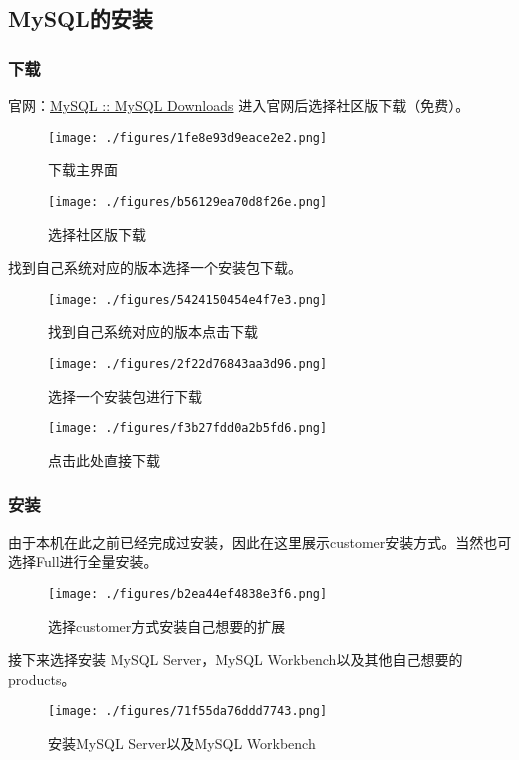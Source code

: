 \subsection{MySQL的安装}

\subsubsection{下载}
官网：\href{https://www.mysql.com/downloads/}{MySQL :: MySQL Downloads}
进入官网后选择社区版下载（免费）。
\begin{figure}[ht]
\centering
\texttt{[image: ./figures/1fe8e93d9eace2e2.png]}
\caption{下载主界面} \label{fig_MSQ001_3}
\end{figure}

\begin{figure}[ht]
\centering
\texttt{[image: ./figures/b56129ea70d8f26e.png]}
\caption{选择社区版下载} \label{fig_MSQ001_4}
\end{figure}
找到自己系统对应的版本选择一个安装包下载。
\begin{figure}[ht]
\centering
\texttt{[image: ./figures/5424150454e4f7e3.png]}
\caption{找到自己系统对应的版本点击下载} \label{fig_MSQ001_5}
\end{figure}

\begin{figure}[ht]
\centering
\texttt{[image: ./figures/2f22d76843aa3d96.png]}
\caption{选择一个安装包进行下载} \label{fig_MSQ001_6}
\end{figure}

\begin{figure}[ht]
\centering
\texttt{[image: ./figures/f3b27fdd0a2b5fd6.png]}
\caption{点击此处直接下载} \label{fig_MSQ001_7}
\end{figure}

\subsubsection{安装}
由于本机在此之前已经完成过安装，因此在这里展示customer安装方式。当然也可选择Full进行全量安装。
\begin{figure}[ht]
\centering
\texttt{[image: ./figures/b2ea44ef4838e3f6.png]}
\caption{选择customer方式安装自己想要的扩展} \label{fig_MSQ001_8}
\end{figure}

接下来选择安装 MySQL Server，MySQL Workbench以及其他自己想要的products。
\begin{figure}[ht]
\centering
\texttt{[image: ./figures/71f55da76ddd7743.png]}
\caption{安装MySQL Server以及MySQL Workbench} \label{fig_MSQ001_9}
\end{figure}

